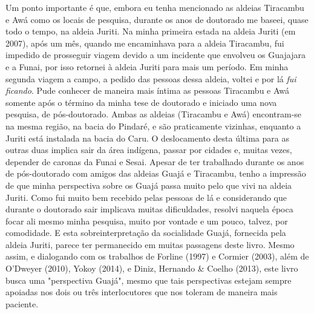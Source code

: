 Um ponto importante é que, embora eu tenha mencionado as aldeias
Tiracambu e Awá como os locais de pesquisa, durante os anos de doutorado
me baseei, quase todo o tempo, na aldeia Juriti. Na minha primeira
estada na aldeia Juriti (em 2007), após um mês, quando me encaminhava
para a aldeia Tiracambu, fui impedido de prosseguir viagem devido a um
incidente que envolveu os Guajajara e a Funai, por isso retornei à
aldeia Juriti para mais um período. Em minha segunda viagem a campo, a
pedido das pessoas dessa aldeia, voltei e por lá \emph{fui ficando}.
Pude conhecer de maneira mais íntima as pessoas Tiracambu e Awá somente
após o término da minha tese de doutorado e iniciado uma nova pesquisa,
de pós-doutorado. Ambas as aldeias (Tiracambu e Awá) encontram-se na
mesma região, na bacia do Pindaré, e são praticamente vizinhas, enquanto
a Juriti está instalada na bacia do Caru. O deslocamento desta última
para as outras duas implica sair da área indígena, passar por cidades e,
muitas vezes, depender de caronas da Funai e Sesai. Apesar de ter
trabalhado durante os anos de pós-doutorado com amigos das aldeias Guajá
e Tiracambu, tenho a impressão de que minha perspectiva sobre os Guajá
passa muito pelo que vivi na aldeia Juriti. Como fui muito bem recebido
pelas pessoas de lá e considerando que durante o doutorado sair
implicava muitas dificuldades, resolvi naquela época focar ali mesmo
minha pesquisa, muito por vontade e um pouco, talvez, por comodidade. E
esta sobreinterpretação da socialidade Guajá, fornecida pela aldeia
Juriti, parece ter permanecido em muitas passagens deste livro. Mesmo
assim, e dialogando com os trabalhos de Forline (1997) e Cormier (2003),
além de O'Dweyer (2010), Yokoy (2014), e Diniz, Hernando \& Coelho
(2013), este livro busca uma "perspectiva Guajá", mesmo que tais
perspectivas estejam sempre apoiadas nos dois ou três interlocutores que
nos toleram de maneira mais paciente.

